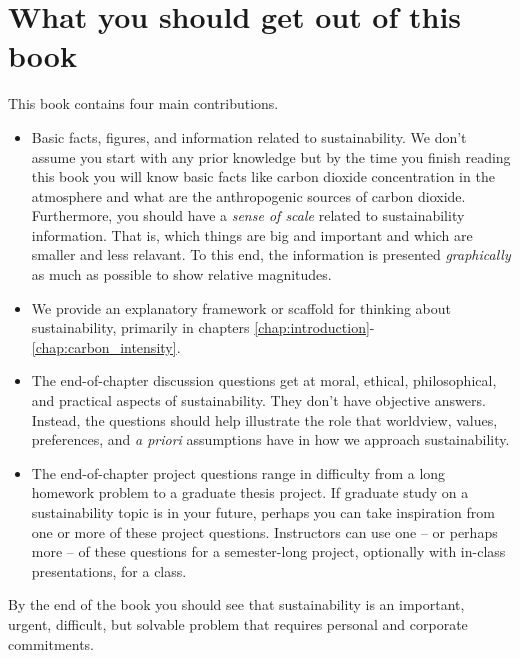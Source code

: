 {\section*{What you should get out of this book} 
This book contains four main contributions.
\begin{itemize}
\item Basic facts, figures, and information related to sustainability. 
We don't assume you start with any prior knowledge but by the time you finish 
reading this book you will know basic facts like carbon dioxide 
concentration in the atmosphere and what are the anthropogenic sources of 
carbon dioxide. 
Furthermore, you should have a \emph{sense of scale} related to sustainability 
information. 
That is, which things are big and important and which are smaller and less relavant. 
To this end, the information is presented \emph{graphically} as much as possible 
to show relative magnitudes.
\item We provide an explanatory framework or scaffold for thinking about sustainability,
primarily in chapters \ref{chap:introduction}-\ref{chap:carbon_intensity}.
\item The end-of-chapter discussion questions get at moral, ethical, philosophical,
and practical aspects of sustainability. 
They don't have %
objective answers. 
Instead, the questions should help illustrate the role that worldview, values, 
preferences, and \emph{a priori} assumptions have in how we approach sustainability. 
\item The end-of-chapter project questions range in difficulty from a long
homework problem to a graduate thesis project. 
If graduate study on a sustainability topic is in your future, perhaps you can 
take inspiration from one or more of these project questions. 
Instructors can use one -- or perhaps more -- of these questions for a 
semester-long project, optionally with in-class presentations, for a class.
\end{itemize}
By the end of the book you should see that sustainability is an important, 
urgent, difficult, but solvable problem that requires personal and corporate 
commitments. \\

}
